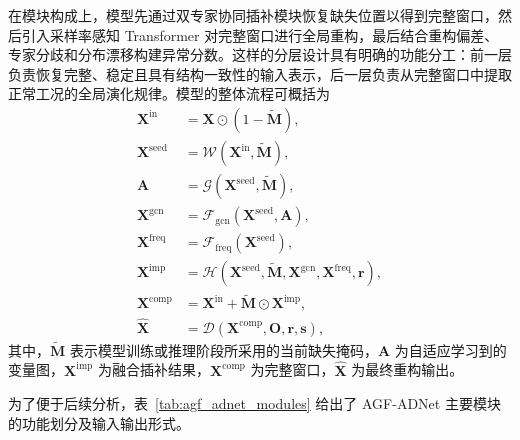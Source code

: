\documentclass[bachelor, vlined]{DissertUESTC}
\begin{document}
    在模块构成上，模型先通过双专家协同插补模块恢复缺失位置以得到完整窗口，然后引入采样率感知 Transformer 对完整窗口进行全局重构，最后结合重构偏差、专家分歧和分布漂移构建异常分数。这样的分层设计具有明确的功能分工：前一层负责恢复完整、稳定且具有结构一致性的输入表示，后一层负责从完整窗口中提取正常工况的全局演化规律。模型的整体流程可概括为
    \begin{align}
        \mathbf{X}^{\mathrm{in}} &= \mathbf{X} \odot (1-\widetilde{\mathbf{M}}), \\
        \mathbf{X}^{\mathrm{seed}} &= \mathcal{W}\!\left(\mathbf{X}^{\mathrm{in}}, \widetilde{\mathbf{M}}\right), \\
        \mathbf{A} &= \mathcal{G}\!\left(\mathbf{X}^{\mathrm{seed}}, \widetilde{\mathbf{M}}\right), \\
        \mathbf{X}^{\mathrm{gcn}} &= \mathcal{F}_{\mathrm{gcn}}\!\left(\mathbf{X}^{\mathrm{seed}}, \mathbf{A}\right), \\
        \mathbf{X}^{\mathrm{freq}} &= \mathcal{F}_{\mathrm{freq}}\!\left(\mathbf{X}^{\mathrm{seed}}\right), \\
        \mathbf{X}^{\mathrm{imp}} &= \mathcal{H}\!\left(\mathbf{X}^{\mathrm{seed}}, \widetilde{\mathbf{M}}, \mathbf{X}^{\mathrm{gcn}}, \mathbf{X}^{\mathrm{freq}}, \mathbf{r}\right), \\
        \mathbf{X}^{\mathrm{comp}} &= \mathbf{X}^{\mathrm{in}} + \widetilde{\mathbf{M}} \odot \mathbf{X}^{\mathrm{imp}}, \\
        \hat{\mathbf{X}} &= \mathcal{D}\!\left(\mathbf{X}^{\mathrm{comp}}, \mathbf{O}, \mathbf{r}, \mathbf{s}\right),
    \end{align}
    其中，$\widetilde{\mathbf{M}}$ 表示模型训练或推理阶段所采用的当前缺失掩码，$\mathbf{A}$ 为自适应学习到的变量图，$\mathbf{X}^{\mathrm{imp}}$ 为融合插补结果，$\mathbf{X}^{\mathrm{comp}}$ 为完整窗口，$\hat{\mathbf{X}}$ 为最终重构输出。
    
    为了便于后续分析，表~\ref{tab:agf_adnet_modules} 给出了 AGF-ADNet 主要模块的功能划分及输入输出形式。
    
\end{document}
